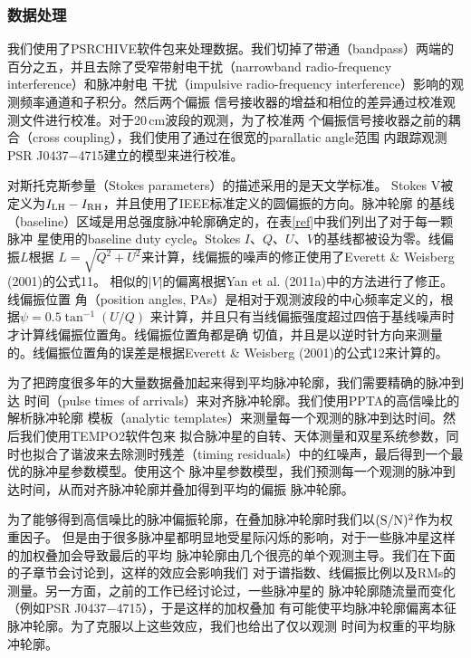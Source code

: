 \subsubsection{数据处理}

我们使用了PSRCHIVE软件包来处理数据\supercite{Hotan04}。我们切掉了带通（bandpass）两端的
百分之五，并且去除了受窄带射电干扰（narrowband radio-frequency interference）和脉冲射电
干扰（impulsive radio-frequency interference）影响的观测频率通道和子积分。然后两个偏振
信号接收器的增益和相位的差异通过校准观测文件进行校准。对于20\,cm波段的观测，为了校准两
个偏振信号接收器之前的耦合（cross coupling），我们使用了通过在很宽的parallatic angle范围
内跟踪观测PSR J0437$-$4715建立的模型来进行校准\supercite{VanStraten04}。

对斯托克斯参量（Stokes parameters）的描述采用的是天文学标准\supercite{VanStraten10}。
Stokes V被定义为$I_{\rm{LH}}-I_{\rm{RH}}$，并且使用了IEEE标准定义的圆偏振的方向。脉冲轮廓
的基线（baseline）区域是用总强度脉冲轮廓确定的，在表\ref{ref}中我们列出了对于每一颗脉冲
星使用的baseline duty cycle。Stokes $I$、$Q$、$U$、$V$的基线都被设为零。线偏振$L$根据
$L=\sqrt{Q^2+U^2}$来计算，线偏振的噪声的修正使用了Everett \& Weisberg (2001)\supercite{Everett01}的公式11。
相似的$|V|$的偏离根据Yan et al. (2011a)\supercite{Yan11a}中的方法进行了修正。线偏振位置
角（position angles, PAs）是相对于观测波段的中心频率定义的，根据$\psi=0.5\tan^{-1}(U/Q)$
来计算，并且只有当线偏振强度超过四倍于基线噪声时才计算线偏振位置角。线偏振位置角都是确
切值，并且是以逆时针方向来测量的。线偏振位置角的误差是根据Everett \& Weisberg (2001)\supercite{Everett01}的公式12来计算的。

为了把跨度很多年的大量数据叠加起来得到平均脉冲轮廓，我们需要精确的脉冲到达
时间（pulse times of arrivals）来对齐脉冲轮廓。我们使用PPTA的高信噪比的解析脉冲轮廓
模板（analytic templates）来测量每一个观测的脉冲到达时间。然后我们使用TEMPO2软件包来
拟合脉冲星的自转、天体测量和双星系统参数，同时也拟合了谐波来去除测时残差（timing 
residuals）中的红噪声\supercite{Hobbs06}，最后得到一个最优的脉冲星参数模型。使用这个
脉冲星参数模型，我们预测每一个观测的脉冲到达时间，从而对齐脉冲轮廓并叠加得到平均的偏振
脉冲轮廓。

为了能够得到高信噪比的脉冲偏振轮廓，在叠加脉冲轮廓时我们以$(\rm{S/N})^2$作为权重因子。
但是由于很多脉冲星都明显地受星际闪烁的影响，对于一些脉冲星这样的加权叠加会导致最后的平均
脉冲轮廓由几个很亮的单个观测主导。我们在下面的子章节会讨论到，这样的效应会影响我们
对于谱指数、线偏振比例以及RMs的测量。另一方面，之前的工作已经讨论过，一些脉冲星的
脉冲轮廓随流量而变化（例如PSR J0437$-$4715）\supercite{Oslowski14}，于是这样的加权叠加
有可能使平均脉冲轮廓偏离本征脉冲轮廓。为了克服以上这些效应，我们也给出了仅以观测
时间为权重的平均脉冲轮廓。

